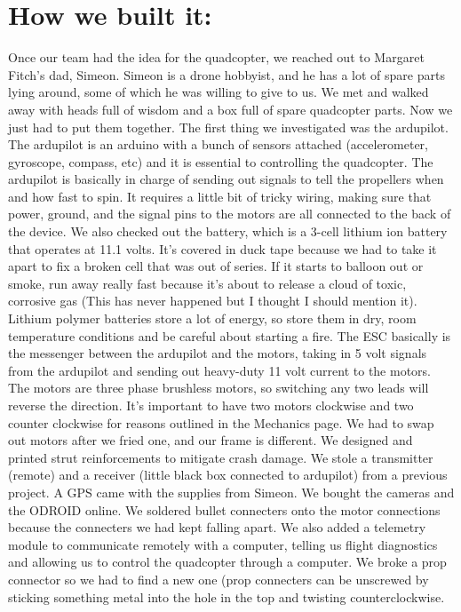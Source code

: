 \documentclass{article}
\begin{document}
\section{How we built it:}
Once our team had the idea for the quadcopter, we reached out to Margaret Fitch's dad, Simeon. Simeon is a drone hobbyist, and he has a lot of spare parts lying around, some of which he was willing to give to us. We met and walked away with heads full of wisdom and a box full of spare quadcopter parts. Now we just had to put them together. The first thing we investigated was the ardupilot. The ardupilot is an arduino with a bunch of sensors attached (accelerometer, gyroscope, compass, etc) and it is essential to controlling the quadcopter. The ardupilot is basically in charge of sending out signals to tell the propellers when and how fast to spin. It requires a little bit of tricky wiring, making sure that power, ground, and the signal pins to the motors are all connected to the back of the device. We also checked out the battery, which is a 3-cell lithium ion battery that operates at 11.1 volts. It's covered in duck tape because we had to take it apart to fix a broken cell that was out of series. If it starts to balloon out or smoke, run away really fast because it's about to release a cloud of toxic, corrosive gas (This has never happened but I thought I should mention it). Lithium polymer batteries store a lot of energy, so store them in dry, room temperature conditions and be careful about starting a fire. The ESC basically is the messenger between the ardupilot and the motors, taking in 5 volt signals from the ardupilot and sending out heavy-duty 11 volt current to the motors. The motors are three phase brushless motors, so switching any two leads will reverse the direction. It's important to have two motors clockwise and two counter clockwise for reasons outlined in the Mechanics page. We had to swap out motors after we fried one, and our frame is different. We designed and printed strut reinforcements to mitigate crash damage. We stole a transmitter (remote) and a receiver (little black box connected to ardupilot) from a previous project. A GPS came with the supplies from Simeon. We bought the cameras and the ODROID online. We soldered bullet connecters onto the motor connections because the connecters we had kept falling apart. We also added a telemetry module to communicate remotely with a computer, telling us flight diagnostics and allowing us to control the quadcopter through a computer. We broke a prop connector so we had to find a new one (prop connecters can be unscrewed by sticking something metal into the hole in the top and twisting counterclockwise.
\end{document}
